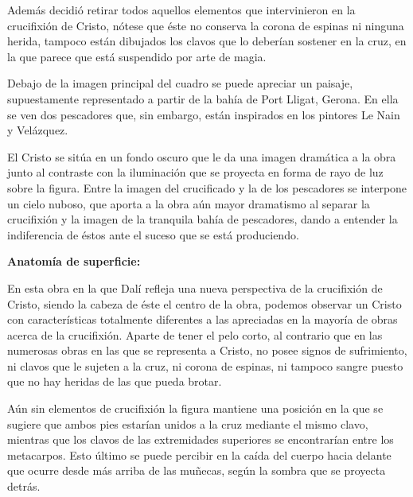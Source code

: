 Además decidió retirar todos aquellos elementos que intervinieron en la crucifixión de Cristo, nótese que éste no conserva la corona de espinas ni ninguna herida, tampoco están dibujados los clavos que lo deberían sostener en la cruz, en la que parece que está suspendido por arte de magia.

Debajo de la imagen principal del cuadro se puede apreciar un paisaje, supuestamente representado a partir de la bahía de Port Lligat, Gerona. En ella se ven dos pescadores que, sin embargo, están inspirados en los pintores Le Nain y Velázquez. %

El Cristo se sitúa en un fondo oscuro que le da una imagen dramática a la obra junto al contraste con la iluminación que se proyecta en forma de rayo de luz sobre la figura. Entre la imagen del crucificado y la de los pescadores se interpone un cielo nuboso, que aporta a la obra aún mayor dramatismo al separar la crucifixión y la imagen de la tranquila bahía de pescadores, dando a entender la indiferencia de éstos ante el suceso que se está produciendo.


\newpage
\textbf{Anatomía de superficie:}

En esta obra en la que Dalí refleja una nueva perspectiva de la crucifixión de Cristo, siendo la cabeza de éste el centro de la obra, podemos observar un Cristo con características totalmente diferentes a las apreciadas en la mayoría de obras acerca de la crucifixión. Aparte de tener el pelo corto, al contrario que en las numerosas obras en las que se representa a Cristo, no posee signos de sufrimiento, ni clavos que le sujeten a la cruz, ni corona de espinas, ni tampoco sangre puesto que no hay heridas de las que pueda brotar.

Aún sin elementos de crucifixión la figura mantiene una posición en la que se sugiere que ambos pies estarían unidos a la cruz mediante el mismo clavo, mientras que los clavos de las extremidades superiores se encontrarían entre los metacarpos. Esto último se puede percibir en la caída del cuerpo hacia delante que ocurre desde más arriba de las muñecas, según la sombra que se proyecta detrás.

